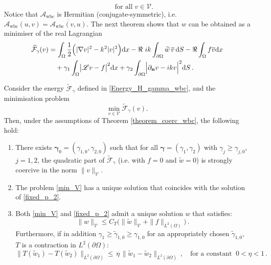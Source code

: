 \documentclass[twoside,11pt]{article}
\def\d{{\mathrm d}}
\def\L{{\mathscr{L}}}
\def\vbar{\overline{v}}
\def\Vc{{\mathscr V}}
\def\L{{\mathscr{L}}}
\begin{document}
{\begin{equation}
\qquad \text{for all } v \in \Vc .
\end{equation}
Notice that  $\mathcal{A}_{\text{wbc}} $ {is Hermitian (conjugate-symmetric)}, i.e. $\mathcal{A}_{\text{wbc}} (u,v)=\overline{\mathcal{A}_{\text{wbc}} (v,u)}$.
The next theorem shows that $w$ can be obtained as a minimiser of the real Lagrangian
\begin{equation}\label{Energy_H_gamma_wbc}
\begin{split}
\widetilde {\mathcal{F}}_{\gamma} (v)
&= \int_{\Omega }  \frac12  \Bigl( |\nabla v |^2 - k^2|v|^2 \Bigr)  \d x
 -  {\Re \ {ik} \int_{\partial \Omega}\widetilde w \, \vbar \, \d S} -  {\Re \int_{\Omega } f  \overline{v}  \d  x}\\
&\quad + \gamma_1 \int_{\Omega} \bigl| \L v - f \bigr|^2   \d x
 +  \gamma_2 \int_{\partial \Omega} \Bigl| \partial_{\mathbf{n}} v - i k  v \Bigr|^2   \d S \, .
\end{split}
\end{equation}


\begin{theorem}%
Consider the energy $\widetilde {\mathcal{F}}_{\gamma}$ defined in \eqref{Energy_H_gamma_wbc}, and the minimisation problem
\begin{equation}\label{min_V}
\min_{v \in \Vc} \widetilde {\mathcal{F}}_{\gamma} (v).
\end{equation}
Then, under the assumptions of Theorem \ref{theorem_coerc_wbc}, the following hold:
\begin{enumerate}
\item[(i)] {There exists $\boldsymbol{\gamma}_0=(\gamma_{1,0},\gamma_{2,0})$ such that for all $\boldsymbol{\gamma}=(\gamma_1,\gamma_2)$ with $\gamma_j\ge \gamma_{j,0}$, $j=1,2$, the quadratic part of $ \widetilde {\mathcal{F}}_{\gamma}$ (i.e. with $f=0$ and $\widetilde w=0$) is strongly coercive in the norm $\|v\|_{\Vc}$.}
\item[(ii)] The problem \eqref{min_V} has a unique solution {that coincides with the   solution of} \eqref{fixed_p_2}.
\item[(iii)] Both \eqref{min_V} and \eqref{fixed_p_2} admit a unique solution $w$  that satisfies: 
$$ \| w\| _{\Vc} \leq C _{T} \big ( \| \widetilde w \|  _{\Vc} + \| f\|_{L^2 (  \Omega)} \big )  \, .$$
Furthermore, if in addition $\gamma_1\ge \tilde \gamma_{1,0}\geq \gamma_{1,0}$ for an appropriately chosen $\tilde \gamma_{1,0},$ $T$ is a contraction in $ L^2 (\partial \Omega):$ 
$$  \|T( \widetilde w _ 1) - T(\widetilde w _2) \| _{L^2 (\partial \Omega)} %
\leq \, \eta \,  \| \widetilde w _ 1 - \widetilde w _2\|  _{L^2 (\partial \Omega)}  \, , \quad \text{for a constant } \ 0< \eta < 1\, .   $$
\end{enumerate}
\end{theorem}

}
\end{document}

